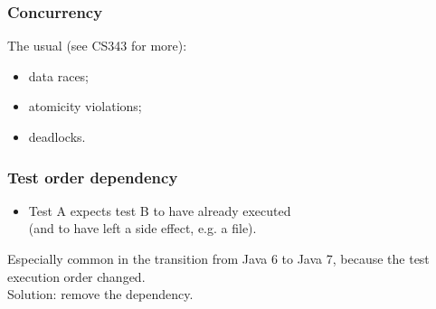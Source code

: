 \documentclass{beamer}
\newenvironment{changemargin}[1]{%
  \begin{list}{}{%
    \setlength{\topsep}{0pt}%
    \setlength{\leftmargin}{#1}%
    \setlength{\rightmargin}{1em}
    \setlength{\listparindent}{\parindent}%
    \setlength{\itemindent}{\parindent}%
    \setlength{\parsep}{\parskip}%
  }%
  \item[]}{\end{list}}
\begin{document}
\begin{frame}[fragile]
  \frametitle{Concurrency}
  \Large
  \begin{changemargin}{1cm}
    The usual (see CS343 for more):
    \begin{itemize}
    \item data races;
    \item atomicity violations;
    \item deadlocks.
    \end{itemize}
  \end{changemargin}
\end{frame}

\begin{frame}[fragile]
  \frametitle{Test order dependency}
  \Large
  \begin{changemargin}{1cm}
    \begin{itemize}
    \item Test A expects test B to have already executed \\
      (and to have left a side effect, e.g. a file).\\[1em]
    \end{itemize}
    Especially common in the transition from Java 6 to Java 7,
    because the test execution order changed.\\[1em]
    Solution: remove the dependency.
  \end{changemargin}
\end{frame}

  
\end{document}
